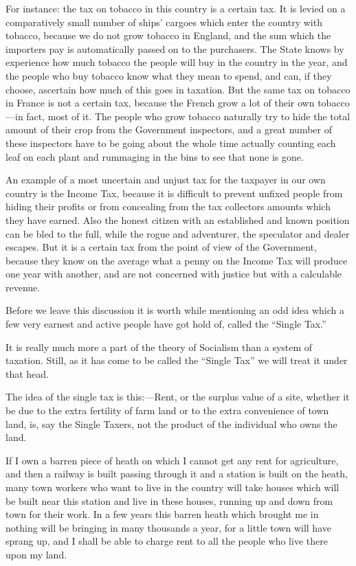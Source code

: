 \documentclass{book}
\begin{document}
For instance: the tax on tobacco in this country is a certain tax. It is levied on a comparatively small number of ships’ cargoes which enter the country with tobacco, because we do not grow tobacco in England, and the sum which the importers pay is automatically passed on to the purchasers. The State knows by experience how much tobacco the people will buy in the country in the year, and the people who buy tobacco know what they mean to spend, and can, if they choose, ascertain how much of this goes in taxation. But the same tax on tobacco in France is not a certain tax, because the French grow a lot of their own tobacco—in fact, most of it. The people who grow tobacco naturally try to hide the total amount of their crop from the Government inspectors, and a great number of these inspectors have to be going about the whole time actually counting each leaf on each plant and rummaging in the bins to see that none is gone.

An example of a most uncertain and unjust tax for the taxpayer in our own country is the Income Tax, because it is difficult to prevent unfixed people from hiding their profits or from concealing from the tax collectors amounts which they have earned. Also the honest citizen with an established and known position can be bled to the full, while the rogue and adventurer, the speculator and dealer escapes. But it is a certain tax from the point of view of the Government, because they know on the average what a penny on the Income Tax will produce one year with another, and are not concerned with justice but with a calculable revenue.

Before we leave this discussion it is worth while mentioning an odd idea which a few very earnest and active people have got hold of, called the “Single Tax.”

It is really much more a part of the theory of Socialism than a system of taxation. Still, as it has come to be called the “Single Tax” we will treat it under that head.

The idea of the single tax is this:—Rent, or the surplus value of a site, whether it be due to the extra fertility of farm land or to the extra convenience of town land, is, say the Single Taxers, not the product of the individual who owns the land.

If I own a barren piece of heath on which I cannot get any rent for agriculture, and then a railway is built passing through it and a station is built on the heath, many town workers who want to live in the country will take houses which will be built near this station and live in these houses, running up and down from town for their work. In a few years this barren heath which brought me in nothing will be bringing in many thousands a year, for a little town will have sprang up, and I shall be able to charge rent to all the people who live there upon my land.
\end{document}
